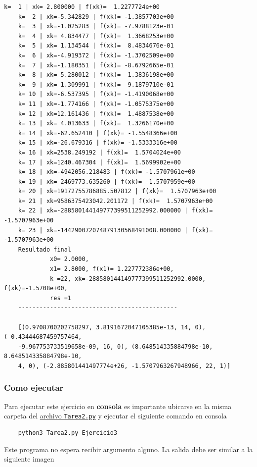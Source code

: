 \documentclass[11pt]{article}
\begin{document}
\begin{multicols}{2}
\begin{Verbatim}[commandchars=\\\{\}]
	k=  1 | xk= 2.800000 | f(xk)=  1.2277724e+00
	k=  2 | xk=-5.342829 | f(xk)= -1.3857703e+00
	k=  3 | xk=-1.025283 | f(xk)= -7.9788123e-01
	k=  4 | xk= 4.834477 | f(xk)=  1.3668253e+00
	k=  5 | xk= 1.134544 | f(xk)=  8.4834676e-01
	k=  6 | xk=-4.919372 | f(xk)= -1.3702509e+00
	k=  7 | xk=-1.180351 | f(xk)= -8.6792665e-01
	k=  8 | xk= 5.280012 | f(xk)=  1.3836198e+00
	k=  9 | xk= 1.309991 | f(xk)=  9.1879710e-01
	k= 10 | xk=-6.537395 | f(xk)= -1.4190068e+00
	k= 11 | xk=-1.774166 | f(xk)= -1.0575375e+00
	k= 12 | xk=12.161436 | f(xk)=  1.4887538e+00
	k= 13 | xk= 4.013633 | f(xk)=  1.3266170e+00
	k= 14 | xk=-62.652410 | f(xk)= -1.5548366e+00
	k= 15 | xk=-26.679316 | f(xk)= -1.5333316e+00
	k= 16 | xk=2538.249192 | f(xk)=  1.5704024e+00
	k= 17 | xk=1240.467304 | f(xk)=  1.5699902e+00
	k= 18 | xk=-4942056.218483 | f(xk)= -1.5707961e+00
	k= 19 | xk=-2469773.635260 | f(xk)= -1.5707959e+00
	k= 20 | xk=19172755786885.507812 | f(xk)=  1.5707963e+00
	k= 21 | xk=9586375423042.201172 | f(xk)=  1.5707963e+00
	k= 22 | xk=-288580144149777399511252992.000000 | f(xk)= -1.5707963e+00
	k= 23 | xk=-144290072074879130568491008.000000 | f(xk)= -1.5707963e+00
	Resultado final
		     x0= 2.0000,
		     x1= 2.8000, f(x1)= 1.227772386e+00,
		     k =22, xk=-288580144149777399511252992.0000, f(xk)=-1.5708e+00,
		     res =1
	---------------------------------------------

	[(0.9708700202758297, 3.8191672047105385e-13, 14, 0), (-0.43444687459757464,
	-9.967753733519658e-09, 16, 0), (8.648514335884798e-10, 8.648514335884798e-10,
	4, 0), (-2.885801441497774e+26, -1.5707963267948966, 22, 1)]
		\end{Verbatim}
\end{multicols}
		\hypertarget{como-ejecutar}{%
	\subsubsection{Como ejecutar}\label{como-ejecutar}}

	Para ejecutar este ejercicio en \textbf{consola} es importante ubicarse
	en la misma carpeta del
	\href{https://github.com/BenchHPZ/UG-Compu/blob/master/MN/Tareas/T2/Tarea2.py}{archivo
	\texttt{Tarea2.py}} y ejecutar el siguiente comando en consola

	\begin{verbatim}
	python3 Tarea2.py Ejercicio3
	\end{verbatim}

	Este programa no espera recibir argumento alguno. La salida debe ser
	similar a la siguiente imagen
\end{document}
